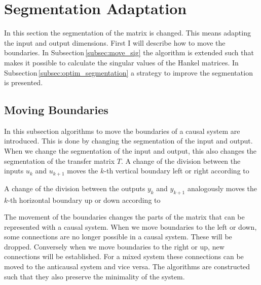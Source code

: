 \documentclass[numbers=noenddot,doctype=mastersthesis,BCOR=15mm,biblatex]{ldvbook}%
\newcommand{\m}{\triangledown} %
\begin{document}
\section{Segmentation Adaptation}\label{sec:Segmentation}

In this section the segmentation of the matrix is changed. 
This means adapting the input and output dimensions. 
First I will describe how to move the boundaries.
In Subsection\,\ref{subsec:move_sig} the algorithm is extended such that makes it possible to calculate the singular values of the Hankel matrices.
In Subsection\,\ref{subsec:optim_segmentation} a strategy to improve the segmentation is presented.

\subsection{Moving Boundaries}\label{subsec:move}
In this subsection algorithms to move the boundaries of a causal system are introduced.
This is done by changing the segmentation of the input and output.
When we change the segmentation of the input and output, this also changes the segmentation of the transfer matrix $T$.
A change of the division between the inputs $u_k$ and $u_{k+1}$ moves the $k$-th vertical boundary left or right according to

A change of the division between the outputs $y_k$ and $y_{k+1}$ analogously moves the $k$-th horizontal boundary up or down according to

The movement of the boundaries changes the parts of the matrix that can be represented with a causal system.
When we move boundaries to the left or down, some connections are no longer possible in a causal system. These will be dropped.
Conversely when we move boundaries to the right or up, new connections will be established.
For a mixed system these connections can be moved to the anticausal system and vice versa.
The algorithms are constructed such that they also preserve the minimality of the system.%
\end{document}
